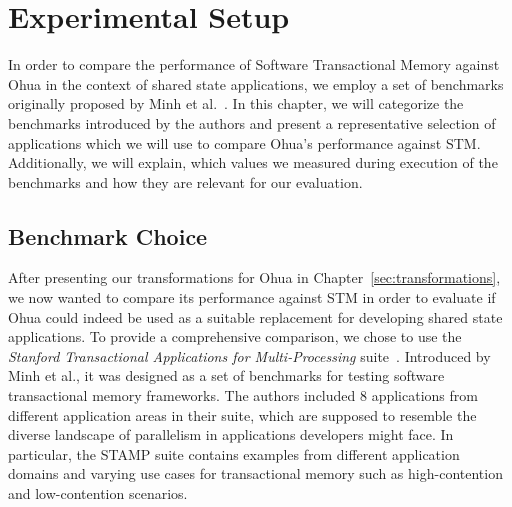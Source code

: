 %
\chapter{Experimental Setup}%
\label{sec:experiments}

In order to compare the performance of Software Transactional Memory against Ohua in the context of shared state applications, we employ a set of benchmarks originally proposed by Minh et al.~\cite{minh2008stamp}.
In this chapter, we will categorize the benchmarks introduced by the authors and present a representative selection of applications which we will use to compare Ohua's performance against STM.
Additionally, we will explain, which values we measured during execution of the benchmarks and how they are relevant for our evaluation.

\section{Benchmark Choice}
\label{sec:experiments:choice}

After presenting our transformations for Ohua in Chapter~\ref{sec:transformations}, we now wanted to compare its performance against STM in order to evaluate if Ohua could indeed be used as a suitable replacement for developing shared state applications.
To provide a comprehensive comparison, we chose to use the \emph{Stanford Transactional Applications for Multi-Processing} suite~\cite{minh2008stamp}.
Introduced by Minh et al., it was designed as a set of benchmarks for testing software transactional memory frameworks.
The authors included 8 applications from different application areas in their suite, which are supposed to resemble the diverse landscape of parallelism in applications developers might face.
In particular, the STAMP suite contains examples from different application domains and varying use cases for transactional memory such as high-contention and low-contention scenarios.

